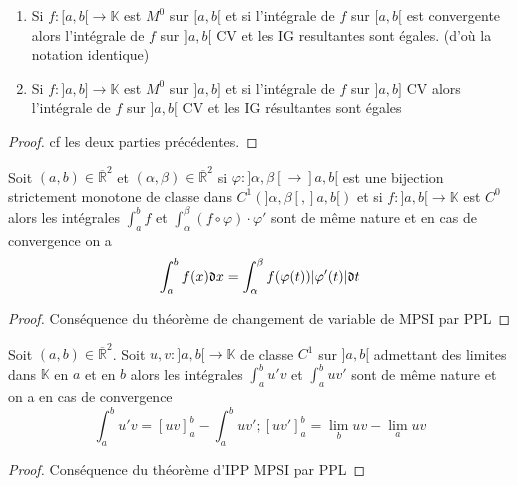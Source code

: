\documentclass[11pt,hidelinks]{book}
\theoremstyle{mytheoremstyle}
\theoremstyle{mytheoremstyle}
\theoremstyle{mytheoremstyle}
\theoremstyle{mytheoremstyle}
\theoremstyle{mytheoremstyle}
\theoremstyle{mytheoremstyle}
\theoremstyle{mytheoremstyle}
\theoremstyle{mytheoremstyle}
\theoremstyle{myproblemstyle}
\def\mbb#1{\mathbb{#1}}
\def\mfk#1{\mathfrak{#1}}
\def\bR{\mbb{R}}
\def\ib#1{\int_{a}^{b} #1}
\def\bK{\mbb{K}}
\def\ab{[a,b[}
\def\abc{]a,b]}
\def\abd{]a,b[}
\newcommand{\func}[3]{#1\colon#2\to#3}
\begin{document}
\begin{adjustwidth}{-2em}{-1em}
        \begin{theorem}
            \begin{enumerate}
            \item Si $\func{f}{\ab}{\bK}$ est $M^0$ sur $\ab$ et si
            l'intégrale de $f$ sur $\ab$ est convergente alors l'intégrale 
            de $f$ sur $\abd$ CV et les IG resultantes sont égales. (d'où la notation identique)

            \item Si $\func{f}{\abc}{\bK}$ est $M^0$ sur $\abc$ et 
            si l'intégrale de $f$ sur $\abc$ CV alors l'intégrale de $f$ 
            sur $\abd$ CV et les IG résultantes sont égales 
            \end{enumerate}
            \begin{proof}
                cf les deux parties précédentes.
            \end{proof}
        \end{theorem}

        \begin{theorem}
            Soit $(a,b) \in \overline{\bR}^2$ et $(\alpha, \beta) \in \overline{\bR}^2$
            si $\func{\varphi}{]\alpha,\beta[}{\abd}$ est une bijection strictement 
            monotone de classe dans $C^1(]\alpha, \beta[,\abd)$ et si 
            $\func{f}{\abd}{\bK}$ est $C^0$ alors les intégrales $\ib{f}$ et $\int_{\alpha}^{\beta} (f \circ \varphi) \cdot \varphi'$ sont 
            de même nature et en cas de convergence on a 
            \begin{equation*}
            \int_{a}^{b} f(x) \mfk{d}x = \int_{\alpha}^{\beta} f(\varphi(t)) \abs{\varphi'(t)} \mfk{d}t
            \end{equation*}
            \begin{proof}
                Conséquence du théorème de changement de variable de MPSI par PPL
            \end{proof}
        \end{theorem}
           \begin{theorem}
            Soit $(a,b) \in \overline{\bR}^2$. 
           Soit $\func{u,v}{\abd}{\bK}$ de classe $C^1$ sur $\abd$ admettant des limites dans $\bK$ en $a$ et en $b$
           alors les intégrales $\ib{u'v}$ et $\ib{uv'}$ sont de même nature 
           et on a en cas de convergence 
           \begin{equation*}
            \ib{u'v} = [uv]^b_a - \ib{uv'} ; [uv']^b_a = \lim_b uv - \lim_a uv    
           \end{equation*} 
           
            \begin{proof}
                Conséquence du théorème d'IPP MPSI par PPL
            \end{proof}
        \end{theorem}
    \end{adjustwidth}
\end{document}
